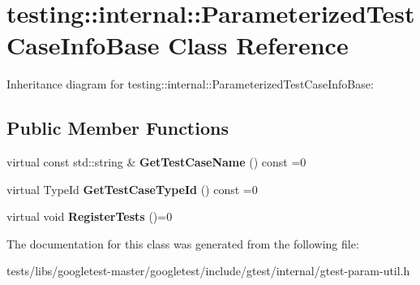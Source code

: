 \hypertarget{classtesting_1_1internal_1_1ParameterizedTestCaseInfoBase}{}\section{testing\+:\+:internal\+:\+:Parameterized\+Test\+Case\+Info\+Base Class Reference}
\label{classtesting_1_1internal_1_1ParameterizedTestCaseInfoBase}


Inheritance diagram for testing\+:\+:internal\+:\+:Parameterized\+Test\+Case\+Info\+Base\+:
\subsection*{Public Member Functions}
\begin{DoxyCompactItemize}
\item 
\mbox{\label{classtesting_1_1internal_1_1ParameterizedTestCaseInfoBase_ac69b3bc29debfd6d891b7f5b2d088b1c}} 
virtual const std\+::string \& {\bfseries Get\+Test\+Case\+Name} () const =0
\item 
\mbox{\label{classtesting_1_1internal_1_1ParameterizedTestCaseInfoBase_a932b4a9185a72d5bdfa5fd84fc06cbca}} 
virtual Type\+Id {\bfseries Get\+Test\+Case\+Type\+Id} () const =0
\item 
\mbox{\label{classtesting_1_1internal_1_1ParameterizedTestCaseInfoBase_a92baca6c64c822c2e7043217f7903ef2}} 
virtual void {\bfseries Register\+Tests} ()=0
\end{DoxyCompactItemize}


The documentation for this class was generated from the following file\+:\begin{DoxyCompactItemize}
\item 
tests/libs/googletest-\/master/googletest/include/gtest/internal/gtest-\/param-\/util.\+h\end{DoxyCompactItemize}
